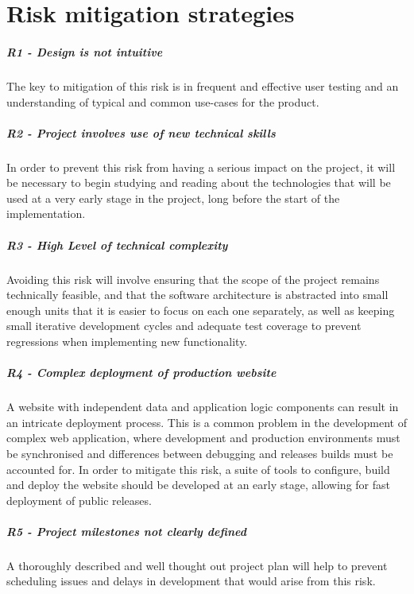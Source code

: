 \chapter{Risk mitigation strategies}\label{app:risk-mitigation}

\paragraph{R1 - Design is not intuitive} The key to mitigation of this
risk is in frequent and effective user testing and an understanding of
typical and common use-cases for the product.

\paragraph{R2 - Project involves use of new technical skills} In order
to prevent this risk from having a serious impact on the project, it
will be necessary to begin studying and reading about the technologies
that will be used at a very early stage in the project, long before
the start of the implementation.

\paragraph{R3 - High Level of technical complexity} Avoiding this risk
will involve ensuring that the scope of the project remains
technically feasible, and that the software architecture is abstracted
into small enough units that it is easier to focus on each one
separately, as well as keeping small iterative development cycles and
adequate test coverage to prevent regressions when implementing new
functionality.

\paragraph{R4 - Complex deployment of production website} A website
with independent data and application logic components can result in
an intricate deployment process. This is a common problem in the
development of complex web application, where development and
production environments must be synchronised and differences between
debugging and releases builds must be accounted for. In order to
mitigate this risk, a suite of tools to configure, build and deploy
the website should be developed at an early stage, allowing for fast
deployment of public releases.

\paragraph{R5 - Project milestones not clearly defined} A thoroughly
described and well thought out project plan will help to prevent
scheduling issues and delays in development that would arise from this
risk.

